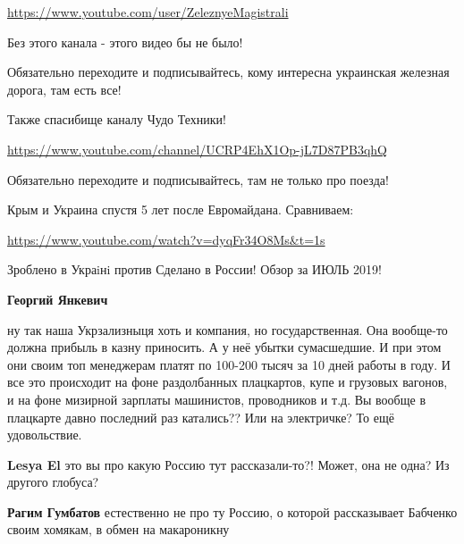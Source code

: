 \begin{itemize}
\begin{itemize}
{\url{https://www.youtube.com/user/ZeleznyeMagistrali}

Без этого канала - этого видео бы не было!

Обязательно переходите и подписывайтесь, кому интересна украинская железная
дорога, там есть все!

Также спасибище каналу Чудо Техники!

\url{https://www.youtube.com/channel/UCRP4EhX1Op-jL7D87PB3qhQ}

Обязательно переходите и подписывайтесь, там не только про поезда!

Крым и Украина спустя 5 лет после Евромайдана. Сравниваем:

\url{https://www.youtube.com/watch?v=dyqFr34O8Ms&t=1s}

Зроблено в Украiнi против Сделано в России! Обзор за ИЮЛЬ 2019!
}

 
\textbf{Георгий Янкевич} 

ну так наша Укрзализныця хоть и компания, но государственная. Она вообще-то
должна прибыль в казну приносить. А у неё убытки сумасшедшие. И при этом они
своим топ менеджерам платят по 100-200 тысяч за 10 дней работы в году. И все
это происходит на фоне раздолбанных плацкартов, купе и грузовых вагонов, и на
фоне мизирной зарплаты машинистов, проводников и т.д. Вы вообще в плацкарте
давно последний раз катались?? Или на электричке? То ещё удовольствие.


 
\textbf{Lesya El} это вы про какую Россию тут рассказали-то?! Может, она не одна? Из другого глобуса?

 
\textbf{Рагим Гумбатов} естественно не про ту Россию, о которой рассказывает Бабченко своим хомякам, в обмен на макароникну


\end{itemize}
\end{itemize}
